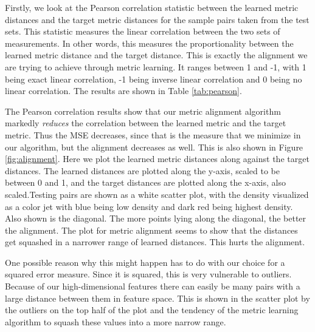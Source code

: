Firstly, we look at the Pearson correlation statistic between the learned metric distances and the target metric distances for the sample pairs taken from the test sets. This statistic measures the linear correlation between the two sets of measurements. In other words, this measures the proportionality between the learned metric distance and the target distance. This is exactly the alignment we are trying to achieve through metric learning. It ranges between 1 and -1, with 1 being exact linear correlation, -1 being inverse linear correlation and 0 being no linear correlation. The results are shown in Table \ref{tab:pearson}.

The Pearson correlation results show that our metric alignment algorithm markedly \emph{reduces} the correlation between the learned metric and the target metric. Thus the MSE decreases, since that is the measure that we minimize in our algorithm, but the alignment decreases as well. This is also shown in Figure \ref{fig:alignment}. Here we plot the learned metric distances along against the target distances. The learned distances are plotted along the y-axis, scaled to be between 0 and 1, and the target distances are plotted along the x-axis, also scaled.Testing pairs are shown as a white scatter plot, with the density visualized as a color jet with blue being low density and dark red being highest density. Also shown is the diagonal. The more points lying along the diagonal, the better the alignment. The plot for metric alignment seems to show that the distances get squashed in a narrower range of learned distances. This hurts the alignment.

One possible reason why this might happen has to do with our choice for a squared error measure. Since it is squared, this is very vulnerable to outliers. Because of our high-dimensional features there can easily be many pairs with a large distance between them in feature space. This is shown in the scatter plot by the outliers on the top half of the plot and the tendency of the metric learning algorithm to squash these values into a more narrow range. 

